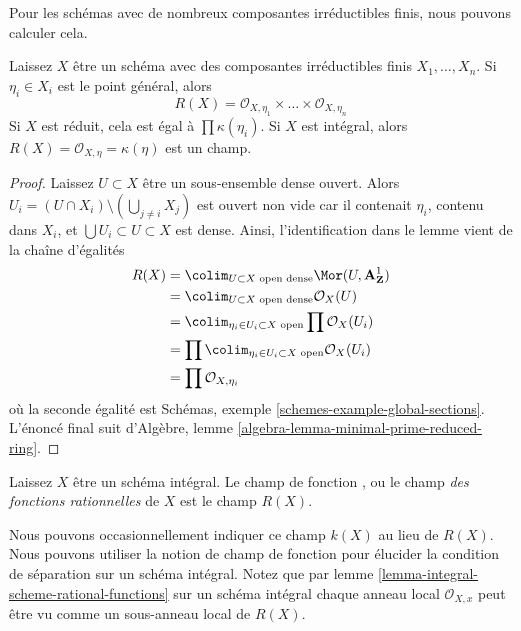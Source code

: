 \noindent
Pour les schémas avec de nombreux composantes irréductibles finis, nous pouvons calculer cela.

\begin{lemma}

\label{lemma-integral-scheme-rational-functions}
Laissez $X$ être un schéma avec des composantes irréductibles finis $X_1, \ldots, X_n$. Si $\eta_i \in X_i$ est le point général, alors $$
R(X) = \mathcal{O}_{X, \eta_1} \times \ldots \times \mathcal{O}_{X, \eta_n}
$$ Si $X$ est réduit, cela est égal à $\prod \kappa(\eta_i)$. Si $X$ est intégral, alors $R(X) = \mathcal{O}_{X, \eta} = \kappa(\eta)$ est un champ.
\end{lemma}

\begin{proof}
Laissez $U \subset X$ être un sous-ensemble dense ouvert. Alors $U_i = (U \cap X_i) \setminus (\bigcup_{j \not = i} X_j)$ est ouvert non vide car il contenait $\eta_i$, contenu dans $X_i$, et $\bigcup U_i \subset U \subset X$ est dense. Ainsi, l'identification dans le lemme vient de la chaîne d'égalités
\begin{align*}
R(X)
& =
\colim_{U \subset X\text{ open dense}} \Mor(U, \mathbf{A}^1_\mathbf{Z}) \\
& =
\colim_{U \subset X\text{ open dense}} \mathcal{O}_X(U) \\
& =
\colim_{\eta_i \in U_i \subset X\text{ open}} \prod \mathcal{O}_X(U_i) \\
& =
\prod \colim_{\eta_i \in U_i \subset X\text{ open}} \mathcal{O}_X(U_i) \\
& =
\prod \mathcal{O}_{X, \eta_i}
\end{align*}
où la seconde égalité est Schémas, exemple \ref{schemes-example-global-sections}. L'énoncé final suit d'Algèbre, lemme \ref{algebra-lemma-minimal-prime-reduced-ring}.
\end{proof}

\begin{definition}

\label{definition-function-field}
Laissez $X$ être un schéma intégral. Le champ de fonction {\it}, ou le champ {\it des fonctions rationnelles} de $X$ est le champ $R(X)$.
\end{definition}

\noindent
Nous pouvons occasionnellement indiquer ce champ $k(X)$ au lieu de $R(X)$. Nous pouvons utiliser la notion de champ de fonction pour élucider la condition de séparation sur un schéma intégral. Notez que par lemme \ref{lemma-integral-scheme-rational-functions} sur un schéma intégral chaque anneau local $\mathcal{O}_{X, x}$ peut être vu comme un sous-anneau local de $R(X)$.


